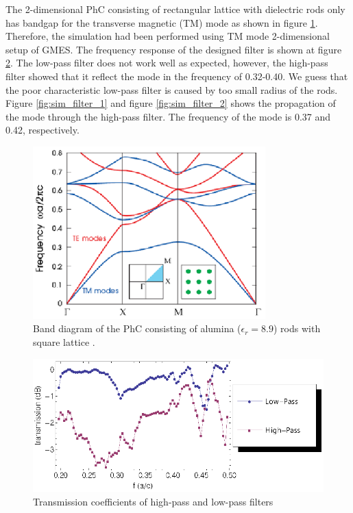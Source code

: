 The 2-dimensional PhC consisting of rectangular lattice with dielectric rods only has bandgap for the transverse magnetic (TM) mode as shown in figure \ref{fig:banddiagram}. Therefore, the simulation had been performed using TM mode 2-dimensional setup of GMES. The frequency response of the designed filter is shown at figure \ref{fig:freq_response_of_filter}. The low-pass filter does not work well as expected, however, the high-pass filter showed that it reflect the mode in the frequency of 0.32-0.40. We guess that the poor characteristic low-pass filter is caused by too small radius of the rods. Figure \ref{fig:sim_filter_1} and figure \ref{fig:sim_filter_2} shows the propagation of the mode through the high-pass filter. The frequency of the mode is 0.37 and 0.42, respectively.

\begin{figure}[hp!]
  \centering
  \includegraphics[width=0.8\textwidth]{figure/banddiagram}
  \caption{Band diagram of the PhC consisting of alumina ($\epsilon_r=8.9$) rods with square lattice \cite[p. 80]{joannopoulos_photonic_2008}.}
  \label{fig:banddiagram}
\end{figure}

\begin{figure}[hp!]
  \centering
  \includegraphics[width=\textwidth]{figure/freq_response_of_filter}
  \caption{Transmission coefficients of high-pass and low-pass filters}
  \label{fig:freq_response_of_filter}
\end{figure}

